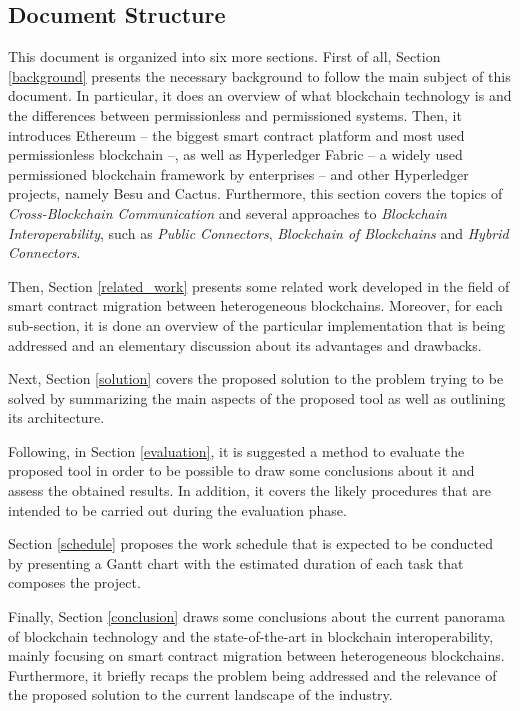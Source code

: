 \documentclass[runningheads]{llncs}
\begin{document}
\subsection{Document Structure}

This document is organized into six more sections. First of all, Section \ref{background} presents the necessary background to follow the main subject of this document. In particular, it does an overview of what blockchain technology is and the differences between permissionless and permissioned systems. Then, it introduces Ethereum -- the biggest smart contract platform and most used permissionless blockchain --, as well as Hyperledger Fabric -- a widely used permissioned blockchain framework by enterprises -- and other Hyperledger projects, namely Besu and Cactus. Furthermore, this section covers the topics of \textit{Cross-Blockchain Communication} and several approaches to \textit{Blockchain Interoperability}, such as \textit{Public Connectors}, \textit{Blockchain of Blockchains} and \textit{Hybrid Connectors}.

Then, Section \ref{related_work} presents some related work developed in the field of smart contract migration between heterogeneous blockchains. Moreover, for each sub-section, it is done an overview of the particular implementation that is being addressed and an elementary discussion about its advantages and drawbacks.

Next, Section \ref{solution} covers the proposed solution to the problem trying to be solved by summarizing the main aspects of the proposed tool as well as outlining its architecture.

Following, in Section \ref{evaluation}, it is suggested a method to evaluate the proposed tool in order to be possible to draw some conclusions about it and assess the obtained results. In addition, it covers the likely procedures that are intended to be carried out during the evaluation phase.

Section \ref{schedule} proposes the work schedule that is expected to be conducted by presenting a Gantt chart with the estimated duration of each task that composes the project.

Finally, Section \ref{conclusion} draws some conclusions about the current panorama of blockchain technology and the state-of-the-art in blockchain interoperability, mainly focusing on smart contract migration between heterogeneous blockchains. Furthermore, it briefly recaps the problem being addressed and the relevance of the proposed solution to the current landscape of the industry.
\end{document}
